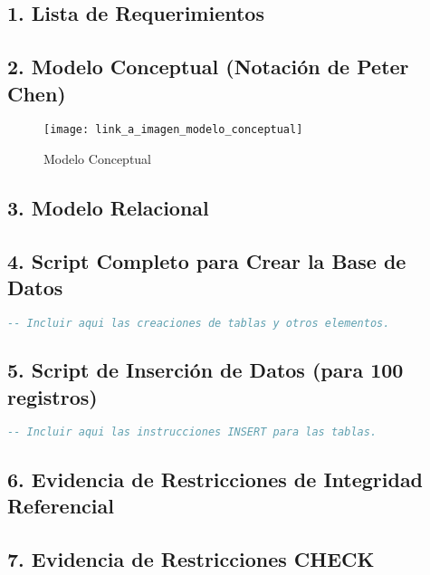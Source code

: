 \documentclass[12pt]{article}
\begin{document}
    \subsection*{1. Lista de Requerimientos}

    \subsection*{2. Modelo Conceptual (Notación de Peter Chen)}
    \begin{figure}[H]
        \centering
        \texttt{[image: link\_a\_imagen\_modelo\_conceptual]}
        \caption{Modelo Conceptual}
        \label{fig:modelo-conceptual}
    \end{figure}

    \subsection*{3. Modelo Relacional}

    \subsection*{4. Script Completo para Crear la Base de Datos}
    \begin{lstlisting}[language=SQL]
        -- Incluir aqui las creaciones de tablas y otros elementos.
    \end{lstlisting}

    \subsection*{5. Script de Inserción de Datos (para 100 registros)}
    \begin{lstlisting}[language=SQL]
        -- Incluir aqui las instrucciones INSERT para las tablas.
    \end{lstlisting}

    \subsection*{6. Evidencia de Restricciones de Integridad Referencial}

    \subsection*{7. Evidencia de Restricciones CHECK}
    
\end{document}
